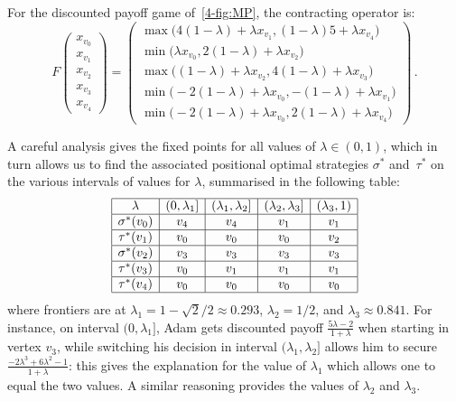 For the discounted payoff game of~\cref{4-fig:MP}, the contracting
operator is:
\[F\left(
  \begin{array}{c}
    x_{v_0}\\x_{v_1}\\x_{v_2}\\x_{v_3}\\x_{v_4}
  \end{array}\right) =
  \left(
    \begin{array}{c}
      \max\big(4(1-\lambda)+\lambda x_{v_1}, (1-\lambda)5+\lambda x_{v_4}\big)\\
      \min\big(\lambda x_{v_0}, 2(1-\lambda)+\lambda x_{v_2}\big)\\
      \max\big((1-\lambda)+\lambda x_{v_2}, 4(1-\lambda)+\lambda x_{v_3}\big)\\
      \min\big(-2(1-\lambda)+\lambda x_{v_0}, -(1-\lambda)+\lambda x_{v_1}\big)\\
      \min\big(-2(1-\lambda)+\lambda x_{v_0}, 2(1-\lambda)+\lambda x_{v_4}\big)
    \end{array}
  \right)\,.\]

A careful analysis gives the fixed points for all values of
$\lambda\in (0,1)$, which in turn allows us to find the associated
positional optimal strategies $\sigma^*$ and~$\tau^*$ on the various
intervals of values for $\lambda$, summarised in the following table:
\[
  \begin{array}{|c|c|c|c|c|}\hline
    \lambda & (0, \lambda_1]
    & (\lambda_1,\lambda_2] & (\lambda_2,\lambda_3]
    & (\lambda_3,1) \\\hline
    \sigma^*(v_0) & v_4 & v_4 &  v_1   & v_1  \\\hline
    \tau^*(v_1) & v_0 &  v_0 &   v_0 &   v_2  \\\hline
    \sigma^*(v_2) & v_3  & v_3   & v_3 &   v_3 \\\hline
    \tau^*(v_3) &v_0 &  v_1  & v_1 &   v_1  \\\hline
    \tau^*(v_4) & v_0 &  v_0  & v_0 &  v_0\\\hline
  \end{array}\]
where frontiers are at $\lambda_1 = 1-\sqrt 2/2 \approx 0.293$,
$\lambda_2 = 1/2$, and $\lambda_3 \approx 0.841$. For instance, on
interval $(0,\lambda_1]$, Adam gets discounted payoff
$\frac{5\lambda-2}{1+\lambda}$ when starting 
in vertex $v_3$, while switching his decision in interval
$(\lambda_1,\lambda_2]$ allows him to secure
$\frac{-2\lambda^3+6\lambda^2-1}{1+\lambda}$: this gives the
explanation for the value of $\lambda_1$ which allows one to equal the
two values. A similar reasoning provides the values of
$\lambda_2$ and $\lambda_3$.

